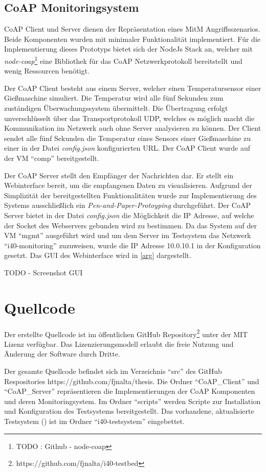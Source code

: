 \subsection{\ac{CoAP} Monitoringsystem}
\ac{CoAP} Client und Server dienen der Repräsentation eines \ac{MitM} Angriffsszenarios. Beide Komponenten wurden mit minimaler Funktionalität implementiert. Für die Implementierung dieses Prototyps bietet sich der NodeJs Stack an, welcher mit \textit{node-coap}\footnote{TODO : Github - node-coap} eine Bibliothek für das \ac{CoAP} Netzwerkprotokoll bereitstellt und wenig Ressourcen benötigt.

Der \ac{CoAP} Client besteht aus einem Server, welcher einen Temperatursensor einer Gießmaschine simuliert. Die Temperatur wird alle fünf Sekunden zum zuständigen Überwachungssystem übermittelt. Die Übertragung erfolgt unverschlüsselt über das Transportprotokoll \ac{UDP}, welches es möglich macht die Kommunikation im Netzwerk auch ohne Server analysieren zu können. Der Client sendet alle fünf Sekunden die Temperatur eines Sensors einer Gießmaschine zu einer in der Datei \textit{config.json} konfigurierten \ac{URL}. Der \ac{CoAP} Client wurde auf der \ac{VM} "`comp"' bereitgestellt.

Der \ac{CoAP} Server stellt den Empfänger der Nachrichten dar. Er stellt ein Webinterface bereit, um die empfangenen Daten zu visualisieren. Aufgrund der Simplizität der bereitgestellten Funktionalitäten wurde zur Implementierung des Systems ausschließlich ein \textit{Pen-and-Paper-Protoyping} durchgeführt. Der \ac{CoAP} Server bietet in der Datei \textit{config.json} die Möglichkeit die \ac{IP} Adresse, auf welche der Socket des Webservers gebunden wird zu bestimmen. Da das System auf der \ac{VM} "`mgmt"' ausgeführt wird und um dem Server im Testsystem das Netzwerk "`i40-monitoring"' zuzuweisen, wurde die \ac{IP} Adresse 10.0.10.1 in der Konfiguration gesetzt. Das \ac{GUI} des Webinterface wird in \autoref{arg} dargestellt.

TODO - Screenshot GUI

\section{Quellcode}
Der erstellte Quellcode ist im öffentlichen GitHub Repository\footnote{https://github.com/fjnalta/i40-testbed} unter der \ac{MIT} Lizenz verfügbar. Das Lizenzierungsmodell erlaubt die freie Nutzung und Änderung der Software durch Dritte.

Der gesamte Quellcode befindet sich im Verzeichnis "`src"' des GitHub Respositories https://github.com/fjnalta/thesis. Die Ordner "`CoAP\_Client"' und "`CoAP\_Server"' repräsentieren die Implementierungen der \ac{CoAP} Komponenten und deren Monitoringsystem. Im Ordner "`scripts"' werden Scripte zur Installation und Konfiguration des Testsystems bereitgestellt. Das vorhandene, aktualisierte Testsystem (\cite{Weber2018}) ist im Ordner "`i40-testsystem"' eingebettet.

